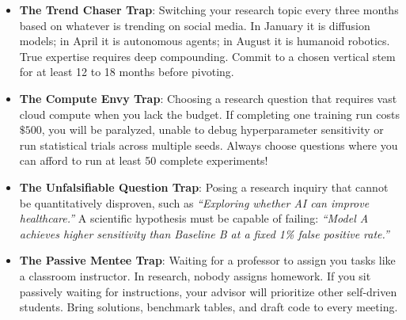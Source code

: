 \begin{warning}
\begin{itemize}
    \item \textbf{The Trend Chaser Trap}:
    Switching your research topic every three months based on whatever is trending on social media. In January it is diffusion models; in April it is autonomous agents; in August it is humanoid robotics. True expertise requires deep compounding. Commit to a chosen vertical stem for at least 12 to 18 months before pivoting.
    \item \textbf{The Compute Envy Trap}:
    Choosing a research question that requires vast cloud compute when you lack the budget. If completing one training run costs $\$500$, you will be paralyzed, unable to debug hyperparameter sensitivity or run statistical trials across multiple seeds. Always choose questions where you can afford to run at least 50 complete experiments!
    \item \textbf{The Unfalsifiable Question Trap}:
    Posing a research inquiry that cannot be quantitatively disproven, such as \emph{``Exploring whether AI can improve healthcare.''} A scientific hypothesis must be capable of failing: \emph{``Model A achieves higher sensitivity than Baseline B at a fixed 1\% false positive rate.''}
    \item \textbf{The Passive Mentee Trap}:
    Waiting for a professor to assign you tasks like a classroom instructor. In research, nobody assigns homework. If you sit passively waiting for instructions, your advisor will prioritize other self-driven students. Bring solutions, benchmark tables, and draft code to every meeting.
\end{itemize}
\end{warning}

